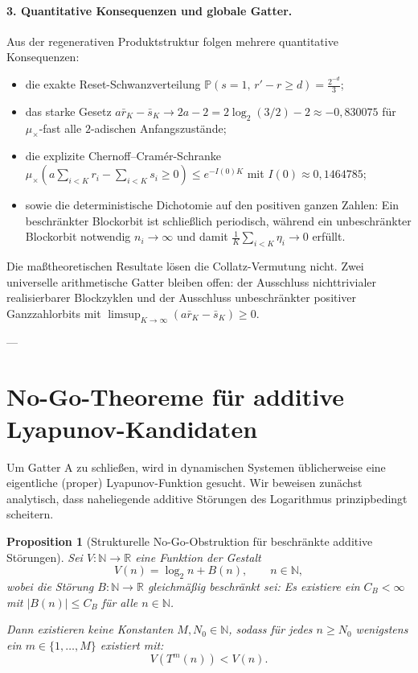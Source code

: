 \documentclass[11pt,reqno]{amsart}
\newtheorem{proposition}[theorem]{Proposition}
\theoremstyle{definition}
\theoremstyle{remark}
\numberwithin{equation}{section}
\begin{document}
\paragraph{3. Quantitative Konsequenzen und globale Gatter.}
Aus der regenerativen Produktstruktur folgen mehrere quantitative Konsequenzen:
\begin{itemize}
\item die exakte Reset-Schwanzverteilung $\mathbb{P}(s = 1, \, r' - r \ge d) = \frac{2^{-d}}{3}$;
\item das starke Gesetz $a\bar{r}_K - \bar{s}_K \to 2a - 2 = 2\log_2(3/2) - 2 \approx -0{,}830075$ f\"ur $\mu_\times$-fast alle $2$-adischen Anfangszustände;
\item die explizite Chernoff--Cram\'er-Schranke $\mu_\times\left( a \sum_{i<K} r_i - \sum_{i<K} s_i \ge 0 \right) \le e^{-I(0)K}$ mit $I(0) \approx 0{,}1464785$;
\item sowie die deterministische Dichotomie auf den positiven ganzen Zahlen: Ein beschr\"ankter Blockorbit ist schlie\ss{}lich periodisch, w\"ahrend ein unbeschr\"ankter Blockorbit notwendig $n_i \to \infty$ und damit $\frac{1}{K} \sum_{i<K} \eta_i \to 0$ erf\"ullt.
\end{itemize}
Die ma\ss{}theoretischen Resultate l\"osen die Collatz-Vermutung nicht. Zwei universelle arithmetische Gatter bleiben offen: der Ausschluss nichttrivialer realisierbarer Blockzyklen und der Ausschluss unbeschr\"ankter positiver Ganzzahlorbits mit $\limsup_{K \to \infty} (a\bar{r}_K - \bar{s}_K) \ge 0$.

---

\section{No-Go-Theoreme f\"ur additive Lyapunov-Kandidaten}

Um Gatter A zu schlie\ss{}en, wird in dynamischen Systemen \"ublicherweise eine eigentliche (proper) Lyapunov-Funktion gesucht. Wir beweisen zun\"achst analytisch, dass naheliegende additive St\"orungen des Logarithmus prinzipbedingt scheitern.

\begin{proposition}[Strukturelle No-Go-Obstruktion f\"ur beschr\"ankte additive St\"orungen]
\label{prop:nogo_lyapunov}
Sei $V: \mathbb{N} \to \mathbb{R}$ eine Funktion der Gestalt
\begin{equation}
V(n) = \log_2 n + B(n), \qquad n \in \mathbb{N},
\end{equation}
wobei die St\"orung $B: \mathbb{N} \to \mathbb{R}$ gleichm\"a\ss{}ig beschr\"ankt sei: Es existiere ein $C_B < \infty$ mit $|B(n)| \le C_B$ f\"ur alle $n \in \mathbb{N}$.

Dann existieren keine Konstanten $M, N_0 \in \mathbb{N}$, sodass f\"ur jedes $n \ge N_0$ wenigstens ein $m \in \{1, \dots, M\}$ existiert mit:
\begin{equation}
V(T^m(n)) < V(n).
\end{equation}
\end{proposition}
\end{document}
